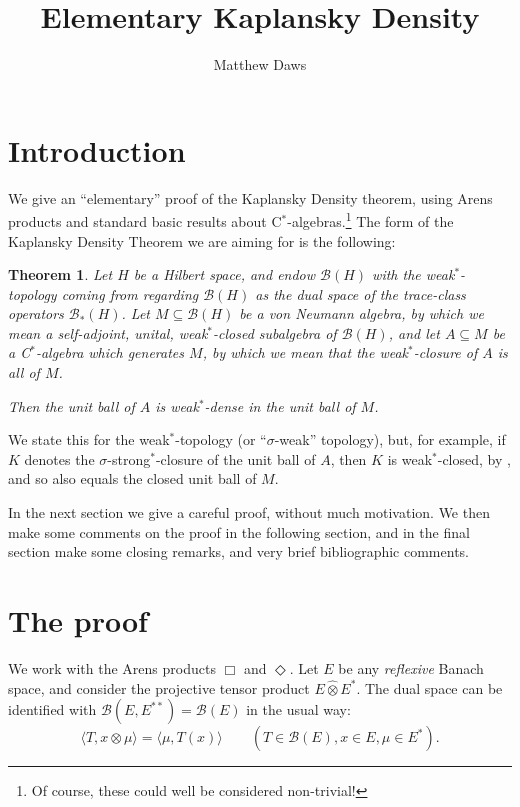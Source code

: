 \documentclass[a4paper,12pt]{article}
\theoremstyle{plain}
\newtheorem{theorem}[proposition]{Theorem}
\theoremstyle{definition}
\newcommand{\mc}{\mathcal}
\newcommand{\ip}[2]{\langle{#1},{#2}\rangle}
\newcommand{\proten}{\widehat\otimes}
\newcommand{\aone}{\Box}
\newcommand{\atwo}{\Diamond}
\begin{document}
\title{Elementary Kaplansky Density}
\author{Matthew Daws}
\maketitle

\section{Introduction}

We give an ``elementary'' proof of the Kaplansky Density theorem, using Arens
products and standard basic results about C$^*$-algebras.\footnote{Of course,
these could well be considered non-trivial!}  The form of the Kaplansky Density
Theorem we are aiming for is the following:

\begin{theorem}
Let $H$ be a Hilbert space, and endow $\mc B(H)$ with the weak$^*$-topology coming
from regarding $\mc B(H)$ as the dual space of the trace-class operators $\mc B_*(H)$.
Let $M\subseteq\mc B(H)$ be a von Neumann algebra, by which we mean a self-adjoint,
unital, weak$^*$-closed subalgebra of $\mc B(H)$, and let $A\subseteq M$ be a
C$^*$-algebra which generates $M$, by which we mean that the weak$^*$-closure of $A$
is all of $M$.

Then the unit ball of $A$ is weak$^*$-dense in the unit ball of $M$.
\end{theorem}

We state this for the weak$^*$-topology (or ``$\sigma$-weak'' topology), but, for 
example, if $K$ denotes the $\sigma$-strong$^*$-closure of the unit ball of $A$,
then $K$ is weak$^*$-closed, by \cite[Chapter~II, Theorem~2.6]{tak1}, and so also
equals the closed unit ball of $M$.

In the next section we give a careful proof, without much motivation.  We then make
some comments on the proof in the following section, and in the final section make
some closing remarks, and very brief bibliographic comments.



\section{The proof}

We work with the Arens products $\aone$ and $\atwo$.  Let $E$ be any \emph{reflexive}
Banach space, and consider the projective tensor product $E\proten E^*$.  The dual
space can be identified with $\mc B(E,E^{**}) = \mc B(E)$ in the usual way:
\[ \ip{T}{x\otimes\mu} = \ip{\mu}{T(x)} \qquad (T\in\mc B(E), x\in E, \mu\in E^*). \]
\end{document}
